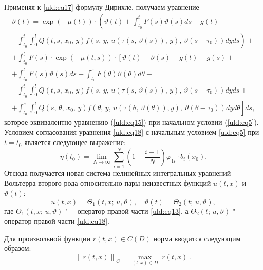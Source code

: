 Применяя к \eqref{uld:eq17} формулу Дирихле, получаем уравнение
\begin{multline}
\label{uld:eq18}
\vartheta  (t)= \exp  (-\mu(t)) \cdot \left( \vartheta  (t)+\int_{t_0}^t F (s)
\vartheta  (s) d s+g (t)- \right.
\\
\left. -\int_{t_0}^t \int_0^l Q (t, s,\,x_0,\,y) f \left( s,\,y,\,u(\tau
(s,\,\vartheta(s)),\,y),\,\vartheta  (s-\tau_0) \right)  dy ds \right) + 
\\
+ \int _{t_0}^t F(s)\cdot \exp \left(-\mu(t,s)\right) \cdot \left[ \vartheta(t)-\vartheta (s) + g(t)-g (s)+ \right.
\\
+ \int_{t_0}^t F(s) \vartheta(s) ds-\int_{t_0}^s F (\theta)  \vartheta  (\theta) d \theta -
\\
-\int_{t_0}^t \int_0^l Q (t, s,\,x_0,\,y) f \left( s,\,y,\,u(\tau  (s,\,\vartheta (s)),\,y),\,
\vartheta  (s-\tau _0) \right)dy ds+ 
\\
\left. +\int_{t_0}^s \int_0^l Q (s,\,\theta,\,x_0,\,y) f \left(\theta,\,y,\,u(\tau (\theta,\,\vartheta(\theta
)) , y), \,\vartheta  (\theta -\tau _0) \right) dy d \theta \right] ds,
\end{multline}
которое эквивалентно уравнению (\ref{uld:eq15}) при
начальном условии (\ref{uld:eq5}). Условием согласования уравнения \eqref{uld:eq18}
с начальным условием \eqref{uld:eq5} при $t=t_0$
является следующее выражение:
$$\eta (t_0)=\lim \limits_{N\to \infty } \sum\limits_{i =1}^N \left( 1-\frac{i-1}{N}\right)  \varphi
_{1 i} \cdot b_i  ( x_0).$$ 
Отсюда получается новая система нелинейных интегральных уравнений Вольтерра второго рода относительно пары неизвестных функций  $u (t , x)$ и $\vartheta  (t)$:
\begin{equation}
\label{uld:eq19}
u (t, x)=\Theta_1 (t, x ;\,u , \vartheta ),  \quad 
\vartheta   (t )=\Theta _2  (t ;\, u , \vartheta),
\end{equation}
где $\Theta _1 (t, x;\,u , \vartheta)$ "--- оператор правой части \eqref{uld:eq13}, а $\Theta _2 (t ;\, u , \vartheta) $ "--- оператор правой части \eqref{uld:eq18}.

\smallskip


 Для произвольной функции $r (t, x)\in C (D)$ норма вводится следующим образом:
\[
\left\| r (t, x) \right\|_C =\max \limits_{(t, x)\in D}   \left| r (t,  x) \right|.
\]

